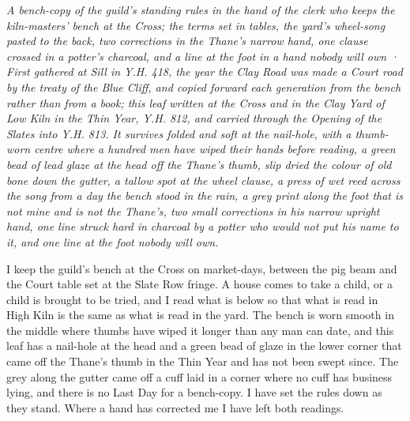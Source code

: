 \documentclass{design/chronicle}
\begin{document}
\clearpage{}
{\centering\FellFont\itshape\footnotesize\color{faded} A bench-copy of the guild’s standing rules in the hand of the clerk who keeps the kiln-masters’ bench at the Cross; the terms set in tables, the yard’s wheel-song pasted to the back, two corrections in the Thane’s narrow hand, one clause crossed in a potter’s charcoal, and a line at the foot in a hand nobody will own · First gathered at Sill in Y.H. 418, the year the Clay Road was made a Court road by the treaty of the Blue Cliff, and copied forward each generation from the bench rather than from a book; this leaf written at the Cross and in the Clay Yard of Low Kiln in the Thin Year, Y.H. 812, and carried through the Opening of the Slates into Y.H. 813. It survives folded and soft at the nail-hole, with a thumb-worn centre where a hundred men have wiped their hands before reading, a green bead of lead glaze at the head off the Thane’s thumb, slip dried the colour of old bone down the gutter, a tallow spot at the wheel clause, a press of wet reed across the song from a day the bench stood in the rain, a grey print along the foot that is not mine and is not the Thane’s, two small corrections in his narrow upright hand, one line struck hard in charcoal by a potter who would not put his name to it, and one line at the foot nobody will own.\par}\medskip
I keep the guild’s bench at the Cross on market-days, between the pig beam and the Court table set at the Slate Row fringe. A house comes to take a child, or a child is brought to be tried, and I read what is below so that what is read in High Kiln is the same as what is read in the yard. The bench is worn smooth in the middle where thumbs have wiped it longer than any man can date, and this leaf has a nail-hole at the head and a green bead of glaze in the lower corner that came off the Thane’s thumb in the Thin Year and has not been swept since. The grey along the gutter came off a cuff laid in a corner where no cuff has business lying, and there is no Last Day for a bench-copy. I have set the rules down as they stand. Where a hand has corrected me I have left both readings.
\end{document}
